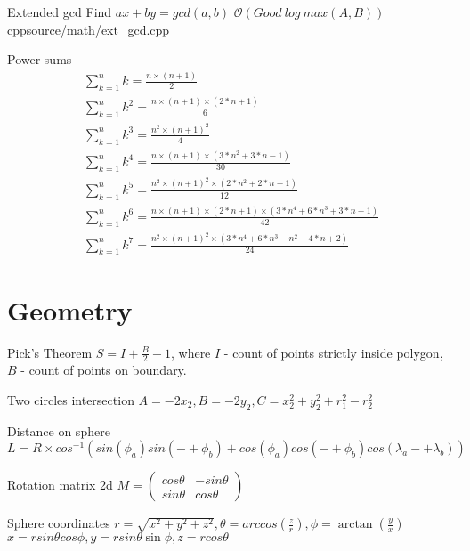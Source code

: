 \documentclass[landscape, 10pt, a4paper, oneside, twocolumn]{extarticle}
\begin{document}
\Algorithm
{Extended gcd}
{Find $a x + b y = gcd(a, b)$}
{$\mathcal{O}(Good\ log\ max(A, B))$}
{cpp}{source/math/ext_gcd.cpp}

\Formula
{Power sums}
{
    \begin{gather}
        \sum_{k=1}^{n} k = \frac{n \times (n + 1)}{2} \\
        \sum_{k=1}^{n} k^{2} = \frac{n \times (n + 1) \times (2 * n + 1)}{6} \\
        \sum_{k=1}^{n} k^{3} = \frac{n^{2} \times (n + 1)^2}{4} \\
        \sum_{k=1}^{n} k^{4} = \frac{n \times (n + 1) \times (3 * n^{2} + 3 * n - 1)}{30} \\
        \sum_{k=1}^{n} k^{5} = \frac{n^{2} \times (n + 1)^{2} \times (2 * n^{2} + 2 * n - 1)}{12} \\
        \sum_{k=1}^{n} k^{6} = \frac{n \times (n + 1) \times (2 * n + 1) \times (3 * n^{4} + 6 * n^{3} + 3 * n + 1)}{42} \\
        \sum_{k=1}^{n} k^{7} = \frac{n^{2} \times (n + 1)^{2} \times (3 * n^{4} + 6 * n^{3} - n^{2} - 4 * n + 2)}{24}
    \end{gather}
}



\section{Geometry}

\Formula
{Pick's Theorem}
{$S = I + \frac{B}{2} - 1$, where $I$ - count of points strictly inside polygon, $B$ - count of points on boundary.}

\Formula
{Two circles intersection}
{$A = -2 x_{2}, B = - 2 y_{2}, C = x_{2}^{2} + y_{2}^{2} + r_{1}^{2} - r_{2}^{2}$}

\Formula
{Distance on sphere}
{$L = R \times cos^{-1}( sin(\phi_{a}) sin(-+ \phi_{b}) + cos(\phi_{a}) cos(-+ \phi_{b}) cos(\lambda_{a} -+ \lambda_{b}) ) $}

\Formula
{Rotation matrix 2d}
{$M = \left( \begin{smallmatrix} cos\theta & - sin\theta \\ sin\theta & cos\theta \end{smallmatrix} \right)$}

\Formula
{Sphere coordinates}
{
    $r = \sqrt{x^{2} + y^{2} + z^{2}}, \theta = arccos(\frac{z}{r}), \phi = \arctan(\frac{y}{x})$ \\
    $x = r sin \theta cos \phi, y = r sin \theta \sin \phi, z = r cos \theta$ \\ 
}    
\end{document}
